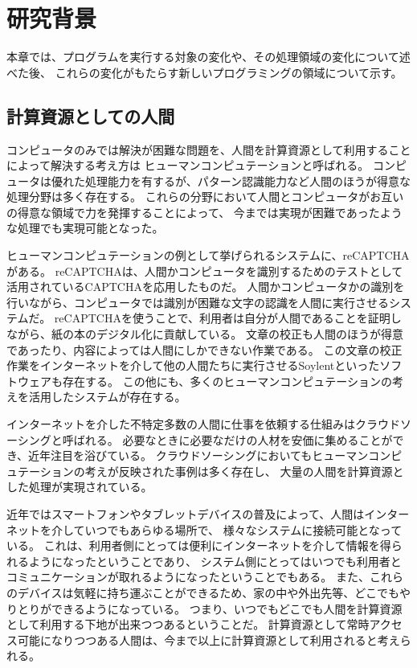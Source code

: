 \chapter{研究背景}\label{chap:background}

本章では、プログラムを実行する対象の変化や、その処理領域の変化について述べた後、
これらの変化がもたらす新しいプログラミングの領域について示す。

\section{計算資源としての人間}\label{sec:human-as-computational-resources}

コンピュータのみでは解決が困難な問題を、人間を計算資源として利用することによって解決する考え方は
ヒューマンコンピュテーション\cite{humancomputation}と呼ばれる。
コンピュータは優れた処理能力を有するが、パターン認識能力など人間のほうが得意な処理分野は多く存在する。
これらの分野において人間とコンピュータがお互いの得意な領域で力を発揮することによって、
今までは実現が困難であったような処理でも実現可能となった。

ヒューマンコンピュテーションの例として挙げられるシステムに、reCAPTCHA\cite{recaptcha}がある。
reCAPTCHAは、人間かコンピュータを識別するためのテストとして活用されているCAPTCHA\cite{captcha}を応用したものだ。
人間かコンピュータかの識別を行いながら、コンピュータでは識別が困難な文字の認識を人間に実行させるシステムだ。
reCAPTCHAを使うことで、利用者は自分が人間であることを証明しながら、紙の本のデジタル化に貢献している。
文章の校正も人間のほうが得意であったり、内容によっては人間にしかできない作業である。
この文章の校正作業をインターネットを介して他の人間たちに実行させるSoylent\cite{soylent}といったソフトウェアも存在する。
この他にも、多くのヒューマンコンピュテーションの考えを活用したシステムが存在する。

インターネットを介した不特定多数の人間に仕事を依頼する仕組みはクラウドソーシング\cite{riseofcrowdsourcing}と呼ばれる。
必要なときに必要なだけの人材を安価に集めることができ、近年注目を浴びている。
クラウドソーシングにおいてもヒューマンコンピュテーションの考えが反映された事例は多く存在し、
大量の人間を計算資源とした処理が実現されている。

近年ではスマートフォンやタブレットデバイスの普及によって、人間はインターネットを介していつでもあらゆる場所で、
様々なシステムに接続可能となっている。
これは、利用者側にとっては便利にインターネットを介して情報を得られるようになったということであり、
システム側にとってはいつでも利用者とコミュニケーションが取れるようになったということでもある。
また、これらのデバイスは気軽に持ち運ぶことができるため、家の中や外出先等、どこでもやりとりができるようになっている。
つまり、いつでもどこでも人間を計算資源として利用する下地が出来つつあるということだ。
計算資源として常時アクセス可能になりつつある人間は、今まで以上に計算資源として利用されると考えられる。

